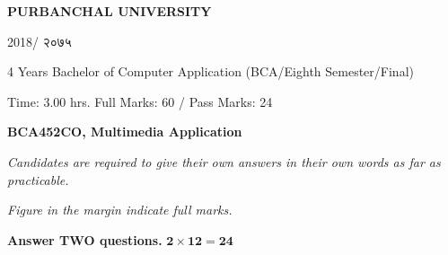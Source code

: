 \documentclass[a4paper, twoside, 12pt, noanswers]{exam}
\newcommand{\textnp}{\texthindi}
\begin{document}

\begin{framed}
	\raggedright{\bfseries\Large\centering PURBANCHAL UNIVERSITY \par {2018/ \textnp{२०७५}}\par}
	{ 4 Years Bachelor of Computer Application (BCA/Eighth Semester/Final)\par}
	{ Time: 3.00 hrs.  \hfill Full Marks: 60 / Pass Marks: 24\par}
	{\bfseries {BCA452CO, Multimedia Application\hfill}\par}
\end{framed}

{\noindent \it{Candidates are required to give their own answers in their own words as far as practicable.  }\par}
{\noindent \it{Figure in the margin indicate full marks.}\par}

{}
{\hspace*{-0.5cm} \bfseries Answer TWO questions.} \hfill {\( \mathbf{2\times 12 =24}\)}
\end{document}
